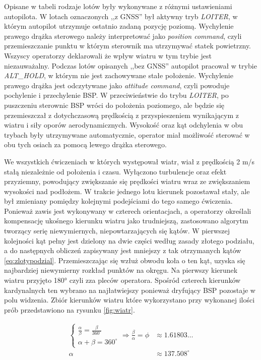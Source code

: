 Opisane w tabeli rodzaje lotów były wykonywane z różnymi ustawieniami autopilota. W lotach oznaczonych ,,z GNSS'' był aktywny tryb \emph{LOITER}, w którym autopilot utrzymuje ostatnio zadaną pozycję poziomą. Wychylenie prawego drążka sterowego należy interpretować jako \emph{position command}, czyli przemieszczanie punktu w którym sterownik ma utrzymywać statek powietrzny. Wszyscy operatorzy deklarowali że wpływ wiatru w tym trybie jest niezauważalny. Podczas lotów opisanych ,,bez GNSS'' autopilot pracował w trybie \emph{ALT\_HOLD}, w którym nie jest zachowywane stałe położenie. Wychylenie prawego drążka jest odczytywane jako \emph{attitude command}, czyli powoduje pochylenie i przechylenie BSP. W przeciwieństwie do trybu \emph{LOITER}, po puszczeniu sterownic BSP wróci do położenia poziomego, ale będzie się przemieszczał z dotychczasową prędkością z przyspieszeniem wynikającym z wiatru i siły oporów aerodynamicznych. Wysokość oraz kąt odchylenia w obu trybach były utrzymywane automatycznie, operator miał możliwość sterować w obu tych osiach za pomocą lewego drążka sterowego.

We wszystkich ćwiczeniach w których występował wiatr, wiał z prędkością 2 m/s stałą niezależnie od położenia i czasu. Wyłączono turbulencje oraz efekt przyziemny, powodujący zwiększanie się prędkości wiatru wraz ze zwiększaniem wysokości nad podłożem. W trakcie jednego lotu kierunek pozostawał stały, ale był zmieniany pomiędzy kolejnymi podejściami do tego samego ćwiczenia. Ponieważ zawis jest wykonywany w czterech orientacjach, a operatorzy określali kompensację ukośnego kierunku wiatru jako trudniejszą, zastosowano algorytm tworzący serię niewymiernych, niepowtarzających się kątów. W pierwszej kolejności kąt pełny jest dzielony na dwie części według zasady złotego podziału, a do następnych obliczeń zapisywany jest mniejszy z tak otrzymanych kątów \ref{eq:zlotypodzial}. Przemieszczając się wzłuż obwodu koła o ten kąt, uzyska się najbardziej niewymierny rozkład punktów na okręgu\cite{ridley1982}. Na pierwszy kierunek wiatru przyjęto 180° czyli zza pleców operatora. Spośród czterech kierunków kardynalnych ten wybrano na najłatwiejszy ponieważ dryfujący BSP pozostaje w polu widzenia. Zbiór kierunków wiatru które wykorzystano przy wykonanej ilości prób przedstawiono na rysunku \ref{fig:wiatr}.

\begin{align}
    \label{eq:zlotypodzial}
    \begin{cases}
        \frac{\alpha}{\beta} = \frac{\beta}{360^{\circ}} \\
        \alpha + \beta = 360^{\circ}
    \end{cases} \Rightarrow \frac{\beta}{\alpha} = \phi &\approx 1.61803\dots
    \\
    \alpha &\approx 137.508^{\circ}
\end{align}


